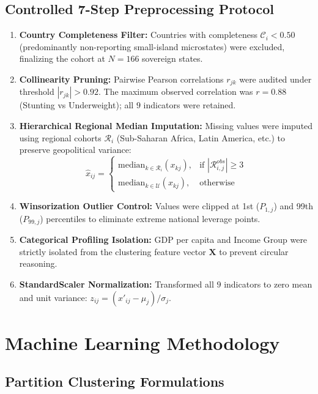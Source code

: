 \documentclass[conference]{IEEEtran}
\begin{document}
\subsection{Controlled 7-Step Preprocessing Protocol}
\begin{enumerate}
    \item \textbf{Country Completeness Filter:} Countries with completeness $\mathcal{C}_i < 0.50$ (predominantly non-reporting small-island microstates) were excluded, finalizing the cohort at $N = 166$ sovereign states.
    \item \textbf{Collinearity Pruning:} Pairwise Pearson correlations $r_{jk}$ were audited under threshold $|r_{jk}| > 0.92$. The maximum observed correlation was $r = 0.88$ (Stunting vs Underweight); all $9$ indicators were retained.
    \item \textbf{Hierarchical Regional Median Imputation:} Missing values were imputed using regional cohorts $\mathcal{R}_i$ (Sub-Saharan Africa, Latin America, etc.) to preserve geopolitical variance:
    \begin{equation}
    \hat{x}_{ij} = \begin{cases} \text{median}_{k \in \mathcal{R}_i}(x_{kj}), & \text{if } |\mathcal{R}_{i,j}^{obs}| \ge 3 \\ \text{median}_{k \in \mathcal{U}}(x_{kj}), & \text{otherwise} \end{cases}
    \end{equation}
    \item \textbf{Winsorization Outlier Control:} Values were clipped at 1st ($P_{1,j}$) and 99th ($P_{99,j}$) percentiles to eliminate extreme national leverage points.
    \item \textbf{Categorical Profiling Isolation:} GDP per capita and Income Group were strictly isolated from the clustering feature vector $\mathbf{X}$ to prevent circular reasoning.
    \item \textbf{StandardScaler Normalization:} Transformed all $9$ indicators to zero mean and unit variance: $z_{ij} = (x'_{ij} - \mu_j) / \sigma_j$.
\end{enumerate}

\section{Machine Learning Methodology}

\subsection{Partition Clustering Formulations}
\end{document}
